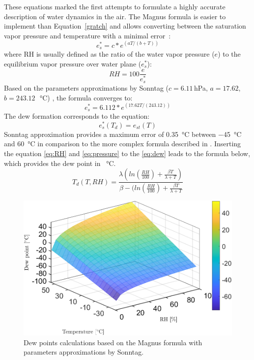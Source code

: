 These equations marked the first attempts to formulate a highly accurate description of water dynamics in the air. The Magnus formula is easier to implement than Equation~\ref{gratch} and allows converting between the saturation vapor pressure and temperature with a minimal error~\cite{magnus}: 
\begin{equation}
    e^{*}_{s} = c*e^{(aT/(b+T))}
\end{equation}
where \gls{RH} is usually defined as the ratio of the water vapor pressure ($e$) to the equilibrium vapor pressure over water plane ($e^{*}_{s}$):
\begin{equation}
    RH = 100\frac{e}{e^{*}_{s}}
    \label{eq:RH}
\end{equation}
Based on the parameters approximations by Sonntag ($c=6.11$\,hPa, $a=17.62$, $b=243.12$\,\SI{}{\celsius}) \cite{magnus}, the formula converges to:
\begin{equation}
    e^{*}_{s} = 6.112*e^{(17.62T/(243.12))}
    \label{eq:pressure}
\end{equation}
The dew formation corresponds to the equation:
\begin{equation}
    e^{*}_{s}(T_{d}) = e_{st}(T)
    \label{eq:dew}
\end{equation}
Sonntag approximation provides a maximum error of \SI{0.35}{\celsius} between \SI{-45}{\celsius} and \SI{60}{\celsius} in comparison to the more complex formula described in \cite{hardy}. 
Inserting the equation \ref{eq:RH} and \ref{eq:pressure} to the \ref{eq:dew} leads to the formula below, which provides the dew point in \SI{}{\celsius}.
\begin{equation}
    T_{d}(T, RH) = \frac{\lambda(ln(\frac{RH}{100})+\frac{\beta T}{\lambda + T})}{\beta - (ln(\frac{RH}{100})+\frac{\beta T}{\lambda + T}}
    \label{eq:td}
\end{equation}
\begin{figure}[!h]
\centering
\includegraphics[width=0.65\columnwidth]{Chapter5/images/dewpointmagnus.png}
\caption{Dew points calculations based on the Magnus formula with parameters approximations by Sonntag.}
\label{fig:dewpointmagnus}
\end{figure}

